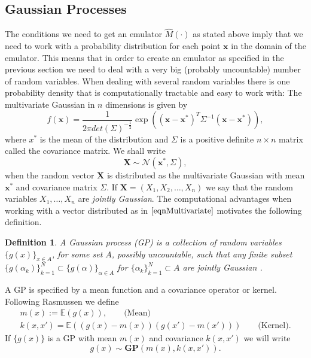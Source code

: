 \documentclass[12pt]{book}
\newtheorem{definition}{Definition}
\newcommand{\E}{\mathbb{E}} %
\begin{document}
\subsection{Gaussian Processes}
The conditions we need to get an emulator $\hat{M}(\cdot)$ as stated above imply that we need
to work with a probability distribution for each point $\textbf{x}$ in the domain of the emulator.
This means that in order to create an emulator as specified in the previous section we need
to deal with a very big (probably uncountable) number of random variables. When dealing with 
several random variables there is one probability density that is computationally tractable and
easy to work with: The multivariate Gaussian in $n$ dimensions is given by \cite{lifshits2013gaussian}
\begin{equation*}
f(\textbf{x})=\frac{1}{2\pi det(\Sigma)^{-\frac{1}{2}}}\exp((\textbf{x}-\textbf{x}^{*})^{T}\Sigma^{-1}
(\textbf{x}-\textbf{x}^{*})),
\end{equation*}
where $x^{*}$ is the mean of the distribution and $\Sigma$ is a positive definite $n\times n$
matrix  called the covariance matrix. We shall write
\begin{equation}\label{eqnMultivariate}
\textbf{X}\sim \mathcal{N}(\textbf{x}^{*},\Sigma),
\end{equation}
when the random vector $\textbf{X}$ is  distributed as
 the multivariate Gaussian with mean $\textbf{x}^{*}$ and covariance matrix
$\Sigma$. If $\textbf{X}=(X_{1},X_{2},\ldots,X_{n})$ we say that the 
random variables $X_{1},\ldots,X_{n}$ are \textit{jointly Gaussian}. The computational advantages
when working with a vector distributed as in  $\ref{eqnMultivariate}$ motivates the following definition.

\begin{definition}\label{dfnGP}
A Gaussian process (GP) is a collection of random variables $\{g(x)\}_{x\in A}$, for some set $A$, 
possibly uncountable,
 such that any finite subset $\{g(\alpha_{k})\}_{k=1}^{N}\subset\{g(\alpha)\}_{\alpha\in A}$ for 
$\{\alpha_{k}\}_{k=1}^{N}\subset A$ are jointly Gaussian
\cite{rasmussen2006gaussian}. 
\end{definition}

A GP is specified by a mean function and a covariance operator or kernel. 
Following  Rasmussen \cite{rasmussen2006gaussian} we define
\begin{eqnarray*}
m(x):=\E(g(x)),\qquad\text{(Mean)}\\
k(x,x')=\E((g(x)-m(x))(g(x')-m(x')))\qquad\text{(Kernel)}.
\end{eqnarray*}
If $\{g(x)\}$ is a GP with mean $m(x)$ and covariance $k(x,x')$ we will write
\begin{equation*}
g(x)\sim \textbf{GP}(m(x),k(x,x')).
\end{equation*} 
\end{document}
